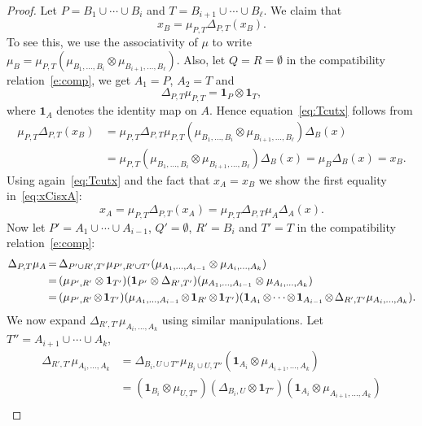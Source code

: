\documentclass[ALCO,ThmDefs,Unicode,epreuves]{cedram}
\newcommand*{\Mk}{\mkern -2mu}
\def\Id{\mathbf{1}}
\begin{document}
\begin{proof}
Let $P=B_1\cup\cdots\cup B_i$ and $T=B_{i+1}\cup\cdots\cup B_\ell$.
We claim that
\begin{equation}\label{eq:Tcutx}
 x_B=\mu_{P,T}\Delta_{P,T}(x_B).
\end{equation}
To see this, we use the associativity of $\mu$ to write $\mu_B=\mu_{P,T}(\mu_{B_1,\ldots,B_i}\otimes\mu_{B_{i+1},\ldots,B_\ell})$. Also, let $Q=R=\emptyset$ in the compatibility relation~\eqref{e:comp}, we get $A_1=P$, $A_2=T$ and 
 $$\Delta_{P,T}\mu_{P,T}=\Id_P\otimes \Id_T,$$
where $\Id_A$ denotes the identity map on $A$. Hence equation~\eqref{eq:Tcutx} follows from
 $$
 \begin{aligned}
 \mu_{P,T}\Delta_{P,T}(x_B)&=\mu_{P,T}\Delta_{P,T}\mu_{P,T}(\mu_{B_1,\ldots,B_i}\otimes\mu_{B_{i+1},\ldots,B_\ell})\Delta_B(x)\\
 &=\mu_{P,T}(\mu_{B_1,\ldots,B_i}\otimes\mu_{B_{i+1},\ldots,B_\ell})\Delta_B(x)=\mu_B\Delta_B(x)=x_B.
 \end{aligned} 
 $$
Using again~\eqref{eq:Tcutx} and the fact that $x_A=x_B$ we show the first equality in~\eqref{eq:xCisxA}:
\begin{equation}\label{eq:TcutS}
 x_A=\mu_{P,T}\Delta_{P,T}(x_A)=\mu_{P,T}\Delta_{P,T}\mu_A\Delta_A(x).
\end{equation}
 Now let $P'=A_1\cup\cdots\cup A_{i-1}$, $Q'=\emptyset$, $R'=B_i $ and $T'=T$ in the compatibility relation~\eqref{e:comp}:
 $$
 \begin{aligned}
 \Delta_{P,T}\mu_A &\Mk= \Mk\Delta_{P'\cup R',T'}\mu_{P',R'\cup T'}(\mu_{A_1,\ldots,A_{i-1}}\otimes \mu_{A_i,\ldots,A_k})\\
 &\Mk=\Mk(\mu_{P',R'}\otimes \Id_{T'})(\Id_{P'}\otimes\Delta_{R',T'})(\mu_{A_1,\ldots,A_{i-1}}\otimes \mu_{A_i,\ldots,A_k})\\
 &\Mk=\Mk(\mu_{P',R'}\Mk\otimes \Mk\Id_{T'})(\mu_{A_1,\ldots,A_{i-1}}\Mk\otimes\Mk\Id_{R'}\Mk\otimes\Mk\Id_{T'})
 (\Id_{A_{1}} \Mk\otimes\Mk\cdots\Mk\otimes \Mk\Id_{A_{i-1}}\Mk\otimes\Mk\Delta_{R',T'}\mu_{A_i,\ldots,A_k}).\\
 \end{aligned}
 $$
 We now expand $\Delta_{R',T'}\mu_{A_i,\ldots,A_k}$ using similar manipulations. Let $T''=A_{i+1}\cup\cdots\cup A_k$,
 $$
 \begin{aligned}
 \Delta_{R',T'}\mu_{A_i,\ldots,A_k} &= \Delta_{B_i , U\cup T''}\mu_{B_i\cup U,T''}(\Id_{A_i}\otimes \mu_{A_{i+1},\ldots,A_k})\\
 &=(\Id_{B_i}\otimes \mu_{U,T''})(\Delta_{B_i,U}\otimes\Id_{T''})(\Id_{A_i}\otimes \mu_{A_{i+1},\ldots,A_k})\\

\end{aligned}$$
\end{proof}
\end{document}
